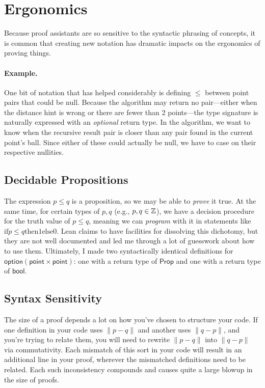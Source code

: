 \documentclass{article}
\begin{document}
\section{Ergonomics}
Because proof assistants are so sensitive to the syntactic phrasing of concepts, it is common that creating new notation has dramatic impacts on the ergonomics of proving things.

\paragraph{Example.}
One bit of notation that has helped considerably is defining $\leq$ between point pairs that could be null.
Because the algorithm may return no pair---either when the distance hint is wrong or there are fewer than 2 points---the type signature is naturally expressed with an \textit{optional} return type.
In the algorithm, we want to know when the recursive result pair is closer than any pair found in the current point's ball.
Since either of these could actually be null, we have to case on their respective nullities.


\subsection{Decidable Propositions}
The expression $p \leq q$ is a proposition, so we may be able to \textit{prove} it true.
At the same time, for certain types of $p, q$ (e.g., $p, q \in \mathbb{Z}$), we have a decision procedure for the truth value of $p \leq q$, meaning we can \textit{program} with it in statements like $\text{if} p \leq q \text{then} 1 \text{else} 0$.
Lean claims to have facilities for dissolving this dichotomy, but they are not well documented and led me through a lot of guesswork about how to use them.
Ultimately, I made two syntactically identical definitions for $\mathsf{option} (\mathsf{point} \times \mathsf{point})$: one with a return type of $\mathsf{Prop}$ and one with a return type of $\mathsf{bool}$.

\subsection{Syntax Sensitivity}
The size of a proof depends a lot on how you've chosen to structure your code.
If one definition in your code uses $\| p - q \|$ and another uses $\| q - p \|$, and you're trying to relate them, you will need to rewrite $\| p - q \|$ into $\| q - p \|$ via commutativity.
Each mismatch of this sort in your code will result in an additional line in your proof, wherever the mismatched definitions need to be related.
Each such inconsistency compounds and causes quite a large blowup in the size of proofs.
\end{document}
